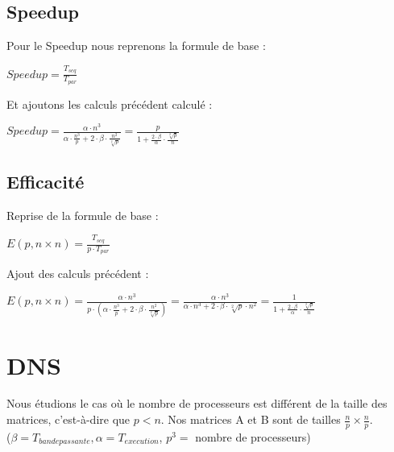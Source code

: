 \documentclass[a4paper]{article}
\begin{document}
\subsection{Speedup}
Pour le Speedup nous reprenons la formule de base :
\begin{center}
$Speedup = \frac{T_{seq}}{T_{par}}$
\end{center}
Et ajoutons les calculs précédent calculé :
\begin{center}
$Speedup = \frac{\alpha \cdot n^3}{\alpha \cdot \frac{n^3}{p} + 2 \cdot \beta \cdot \frac{n^2}{\sqrt[2]{p}}} = \frac{p}{1+\frac{2 \cdot \beta}{\alpha} \cdot \frac{\sqrt[2]{p}}{n}}$
\end{center}

\subsection{Efficacité}
Reprise de la formule de base : 
\begin{center}
$E(p,n \times n) = \frac{T_{seq}}{p \cdot T_{par}}$
\end{center}
Ajout des calculs précédent :
\begin{center}
$E(p,n \times n) = \frac{\alpha \cdot n^3}{p \cdot (\alpha \cdot \frac{n^3}{p}+2 \cdot \beta \cdot \frac{n^2}{\sqrt[2]{p}})} = \frac{\alpha \cdot n^3}{\alpha \cdot n^3+2 \cdot \beta \cdot \sqrt[2]{p} \cdot n^2} = \frac{1}{1+\frac{2 \cdot \beta}{\alpha} \cdot \frac{\sqrt[2]{p}}n}$
\end{center}

\newpage

\section{DNS}
Nous étudions le cas où le nombre de processeurs est différent de la taille des matrices, c'est-à-dire que $p < n$. Nos matrices A et B sont de tailles $\frac{n}{p} \times \frac{n}{p}$. \\ ($\beta = T_{bande passante}, \alpha = T_{execution}$, $p^3 = $ nombre de processeurs)
\end{document}
